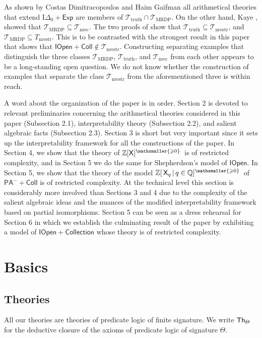 \documentclass{amsart}
\renewcommand{\geq}{\geqslant}
\renewcommand{\Theta}{\varTheta}
\newcommand{\X}{{\sf X}}
\newcommand{\fol}[1]{{\sf Th}_{#1}}
\newcommand{\zxg}{\ensuremath{\mathbb Z[\X]^{\mathsmaller{\geq 0}}}}
\newcommand{\zxxg}{\ensuremath{\mathbb Z[\,\X_q\mathop\mid q \in \mathbb{Q}]^{\mathsmaller{\geq 0}}}}
\newcommand{\T}{{\mathcal T}}
\newcommand{\skippy}{}
\begin{document}
As shown by Costas Dimitracopoulos and Haim Gaifman \cite{gaif:frag82} all arithmetical theories that extend $\mathrm{I}\Delta_0+\mathsf{Exp}$ are members of $\T_{\mathrm{truth}}\cap \T_{\mathrm{MRDP}}$. On the other hand, Kaye \cite [Theorem 3.3]{Kaye_Tennenbaum}, showed that $\T_{\mathrm{MRDP}}\subseteq\T_{\mathrm{nrec}}$. The two proofs of \cite [Theorem B]{Enayat-Visser2024} show that $ \T_{\mathrm{truth}} \subseteq \T_{\mathrm{nrestr}} $, and $ \T_{\mathrm{MRDP}} \subseteq T_{\mathrm{nrestr}} $. This is to be contrasted with the strongest result in this paper that shows that $\mathsf{IOpen +Coll}\notin \T_{\mathrm{nrestr}}$.
Constructing separating examples that distinguish the three classes $\T_{\mathrm{MRDP}}$, $\T_{\mathrm{truth}}$, and $\T_{\mathrm{nrec}}$ from each other appears to be a long-standing open question. We do not know whether the construction of examples that separate the class $\T_{\mathrm{nrestr}}$ from the aforementioned three is within reach. 

\skippy
A word about the organization of the paper is in order. Section 2 is devoted to relevant preliminaries concerning the arithmetical theories considered in this paper (Subsection 2.1), interpretability theory (Subsection 2.2), and salient algebraic facts (Subsection 2.3).  Section 3 is short but very important since it sets up the interpretability framework for all the constructions of the paper.  In Section 4, we show that the theory of \zxg\ is of restricted complexity, and in Section 5 we do the same for Shepherdson's model of $\mathsf{IOpen}$.  In Section 5, we show that the theory of the model \zxxg\
of $\mathsf{PA}^{-}+\mathsf{Coll}$ is of restricted complexity. At the technical level this section is considerably more involved than 
Sections 3 and 4 due to the complexity of the salient algebraic ideas and the nuances of the modified interpretability framework based on partial isomorphisms.  
Section 5 can be seen as a dress rehearsal for Section 6 in which we establish the culminating result of the paper by exhibiting a model of $\mathsf{IOpen}+\mathsf{Collection}$ whose theory is of restricted complexity.  

\section{Basics}

\subsection{Theories}
All our theories are theories of predicate logic of finite signature.
We write $\fol\Theta$ for the deductive closure of the axioms of predicate logic of signature $\Theta$.
\end{document}
